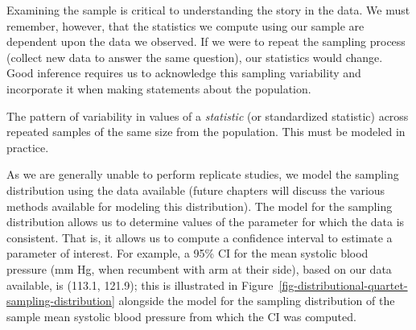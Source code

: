 \documentclass[
  letterpaper,
  DIV=11,
  numbers=noendperiod]{scrreprt}
\theoremstyle{definition}
\theoremstyle{definition}
\theoremstyle{remark}
\begin{document}
Examining the sample is critical to understanding the story in the data.
We must remember, however, that the statistics we compute using our
sample are dependent upon the data we observed. If we were to repeat the
sampling process (collect new data to answer the same question), our
statistics would change. Good inference requires us to acknowledge this
sampling variability and incorporate it when making statements about the
population.

\begin{tcolorbox}[enhanced jigsaw, left=2mm, toprule=.15mm, arc=.35mm, breakable, opacitybacktitle=0.6, opacityback=0, rightrule=.15mm, colbacktitle=quarto-callout-important-color!10!white, coltitle=black, leftrule=.75mm, toptitle=1mm, colframe=quarto-callout-important-color-frame, titlerule=0mm, title=\textcolor{quarto-callout-important-color}{\faExclamation}\hspace{0.5em}{Sampling Distribution}, bottomrule=.15mm, colback=white, bottomtitle=1mm]

The pattern of variability in values of a \emph{statistic} (or
standardized statistic) across repeated samples of the same size from
the population. This must be modeled in practice.

\end{tcolorbox}

As we are generally unable to perform replicate studies, we model the
sampling distribution using the data available (future chapters will
discuss the various methods available for modeling this distribution).
The model for the sampling distribution allows us to determine values of
the parameter for which the data is consistent. That is, it allows us to
compute a confidence interval to estimate a parameter of interest. For
example, a 95\% CI for the mean systolic blood pressure (mm Hg, when
recumbent with arm at their side), based on our data available, is
(113.1, 121.9); this is illustrated in
Figure~\ref{fig-distributional-quartet-sampling-distribution} alongside
the model for the sampling distribution of the sample mean systolic
blood pressure from which the CI was computed.
\end{document}
